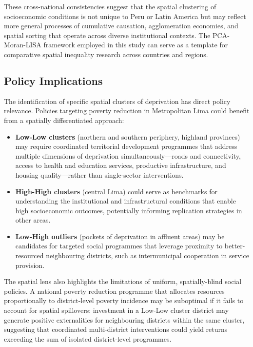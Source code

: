 \documentclass[12pt,a4paper,twoside]{article}
\begin{document}
These cross-national consistencies suggest that the spatial clustering of
socioeconomic conditions is not unique to Peru or Latin America but may reflect
more general processes of cumulative causation, agglomeration economies, and
spatial sorting that operate across diverse institutional contexts. The
PCA-Moran-LISA framework employed in this study can serve as a template for
comparative spatial inequality research across countries and regions.

\subsection{Policy Implications}

The identification of specific spatial clusters of deprivation has direct
policy relevance. Policies targeting poverty reduction in Metropolitan Lima
could benefit from a spatially differentiated approach:

\begin{itemize}
  \item \textbf{Low-Low clusters} (northern and southern periphery, highland
        provinces) may require coordinated territorial development programmes
        that address multiple dimensions of deprivation simultaneously---roads
        and connectivity, access to health and education services, productive
        infrastructure, and housing quality---rather than single-sector
        interventions.
  \item \textbf{High-High clusters} (central Lima) could serve as benchmarks
        for understanding the institutional and infrastructural conditions that
        enable high socioeconomic outcomes, potentially informing replication
        strategies in other areas.
  \item \textbf{Low-High outliers} (pockets of deprivation in affluent areas)
        may be candidates for targeted social programmes that leverage proximity
        to better-resourced neighbouring districts, such as intermunicipal
        cooperation in service provision.
\end{itemize}

The spatial lens also highlights the limitations of uniform, spatially-blind
social policies. A national poverty reduction programme that allocates resources
proportionally to district-level poverty incidence may be suboptimal if it fails
to account for spatial spillovers: investment in a Low-Low cluster district may
generate positive externalities for neighbouring districts within the same
cluster, suggesting that coordinated multi-district interventions could yield
returns exceeding the sum of isolated district-level programmes.
\end{document}
